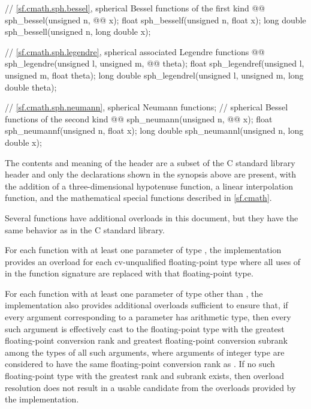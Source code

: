 \begin{codeblock}
{  // \ref{sf.cmath.sph.bessel}, spherical Bessel functions of the first kind
  @@ sph_bessel(unsigned n, @@ x);
  float               sph_besself(unsigned n, float x);
  long double         sph_bessell(unsigned n, long double x);

  // \ref{sf.cmath.sph.legendre}, spherical associated Legendre functions
  @@ sph_legendre(unsigned l, unsigned m, @@ theta);
  float               sph_legendref(unsigned l, unsigned m, float theta);
  long double         sph_legendrel(unsigned l, unsigned m, long double theta);

  // \ref{sf.cmath.sph.neumann}, spherical Neumann functions;
  // spherical Bessel functions of the second kind
  @@ sph_neumann(unsigned n, @@ x);
  float               sph_neumannf(unsigned n, float x);
  long double         sph_neumannl(unsigned n, long double x);
}
\end{codeblock}

\pnum
The contents and meaning of the header 
are a subset of the C standard library header  and
only the declarations shown in the synopsis above are present,
with the addition of
a three-dimensional hypotenuse function,
a linear interpolation function, and
the mathematical special functions described in \ref{sf.cmath}.
\begin{note}
Several functions have additional overloads in this document,
but they have the same behavior as in the C standard library.
\end{note}

\pnum
For each function
with at least one parameter of type ,
the implementation provides
an overload for each cv-unqualified floating-point type
where all uses of  in the function signature
are replaced with that floating-point type.

\pnum
For each function
with at least one parameter of type 
other than ,
the implementation also provides additional overloads sufficient to ensure that,
if every argument corresponding to
a  parameter has arithmetic type,
then every such argument is effectively cast to the floating-point type
with the greatest floating-point conversion rank and
greatest floating-point conversion subrank
among the types of all such arguments,
where arguments of integer type are considered to have
the same floating-point conversion rank as .
If no such floating-point type with the greatest rank and subrank exists,
then overload resolution does not result in
a usable candidate
from the overloads provided by the implementation.

